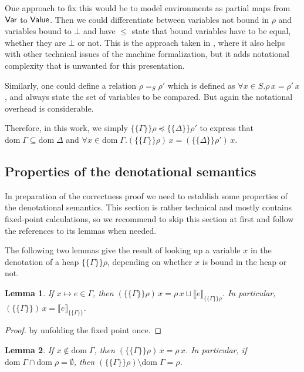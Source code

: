 \documentclass{jfp1}
\newtheorem{lemma}{Lemma}
\theoremstyle{nonumberbreak}
\newtheorem{proof}{Proof}
\newcommand{\sVar}  {\text{\textsf{Var}}}
\newcommand{\sValue}{\text{\textsf{Value}}}
\newcommand{\req}[1]{=_{#1}}
\newcommand{\dom}[1]{\text{dom}\;#1}
\newcommand{\dsem}[2]{\llbracket #1 \rrbracket_{#2}}
\newcommand{\esem}[1]{\{\!\!\!\{#1\}\!\!\!\}}
\begin{document}
One approach to fix this would be to model environments as partial maps from $\sVar$ to $\sValue$. Then we could differentiate between variables not bound in $\rho$ and variables bound to $\bot$ and have $\le$ state that bound variables have to be equal, whether they are $\bot$ or not. This is the approach taken in \cite{afp}, where it also helps with other technical issues of the machine formalization, but it adds notational complexity that is unwanted for this presentation.

Similarly, one could define a relation $\rho \req{S} \rho'$ which is defined as $\forall x \in S. \rho\,x = \rho'\,x$, and always state the set of variables to be compared. But again the notational overhead is considerable.

Therefore, in this work, we simply $\esem{\Gamma}\rho \preceq \esem{\Delta}{\rho'}$ to express that $\dom\Gamma \subseteq \dom\Delta$ and $\forall x\in \dom\Gamma. (\esem{\Gamma}\rho)\,x = (\esem{\Delta}{\rho'})\,x$.

\subsection{Properties of the denotational semantics}
\label{sec:denprops}

In preparation of the correctness proof we need to establish some properties of the denotational semantics. This section is rather technical and mostly contains fixed-point calculations, so we recommend to skip this section at first and follow the references to its lemmas when needed.

The following two lemmas give the result of looking up a variable $x$ in the denotation of a heap $\esem\Gamma\rho$, depending on whether $x$ is bound in the heap or not. 

\begin{lemma}
\label{lem:esem_this}
If $x \mapsto e \in \Gamma$, then $(\esem{\Gamma}\rho)\, x = \rho\, x \sqcup \dsem{e}{\esem{\Gamma}\rho}$. In particular, $(\esem{\Gamma})\, x = \dsem{e}{\esem{\Gamma}}$.
\end{lemma}

\begin{proof}
by unfolding the fixed point once.
\end{proof}

\begin{lemma}
\label{lem:esem_other}%
\label{lem:remove}
If $x \notin \dom \Gamma$, then $(\esem{\Gamma}\rho)\, x = \rho\, x$.
In particular, if $\dom \Gamma \cap \dom \rho = \emptyset$, then $(\esem{\Gamma}\rho) \setminus \dom\Gamma = \rho$.
\end{lemma}
\end{document}
